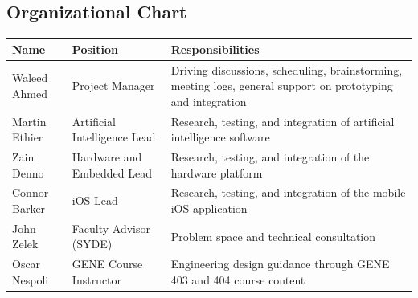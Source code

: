 \documentclass[a4paper,11pt]{article}
\begin{document}
\subsection{Organizational Chart}
\begin{table}[ht]
    \centering
    \begin{tabular}{|p{2.8cm}|p{5.5cm}|p{6.5cm}|}
        \hline
        Name & Position & Responsibilities \\ \hline
        Waleed Ahmed & Project Manager & Driving discussions, scheduling, brainstorming, meeting logs, general support on prototyping and integration
        \\ \hline
        
        Martin Ethier & Artificial Intelligence Lead & 
        Research, testing, and integration of artificial intelligence software
        \\ \hline
        
        Zain Denno & Hardware and Embedded Lead & 
        Research, testing, and integration of the hardware platform \\ \hline
        
        Connor Barker & iOS Lead & 
        Research, testing, and integration of the mobile iOS application \\ \hline
        
        John Zelek & Faculty Advisor (SYDE) & Problem space and technical consultation \\ \hline
        
        Oscar Nespoli & GENE Course Instructor & Engineering design guidance through GENE 403 and 404 course content \\ \hline
    \end{tabular}
\end{table}

\newpage
\end{document}

